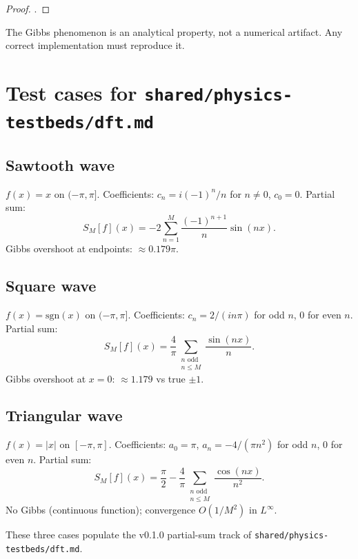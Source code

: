 \documentclass[11pt,a4paper]{article}
\theoremstyle{definition}
\theoremstyle{plain}
\begin{document}
\begin{proof}
\cite[§3.5]{Folland1992}.
\end{proof}

The Gibbs phenomenon is an analytical property, not a numerical artifact.
Any correct implementation must reproduce it.

\section{Test cases for \texttt{shared/physics-testbeds/dft.md}}

\subsection{Sawtooth wave}

$f(x) = x$ on $(-\pi, \pi]$. Coefficients: $c_n = i(-1)^n/n$ for $n \neq 0$,
$c_0 = 0$. Partial sum:
\[
S_M[f](x) = -2 \sum_{n=1}^{M} \frac{(-1)^{n+1}}{n} \sin(nx).
\]
Gibbs overshoot at endpoints: $\approx 0.179\pi$.

\subsection{Square wave}

$f(x) = \mathrm{sgn}(x)$ on $(-\pi, \pi]$. Coefficients: $c_n = 2/(i n \pi)$
for odd $n$, $0$ for even $n$. Partial sum:
\[
S_M[f](x) = \frac{4}{\pi} \sum_{\substack{n \text{ odd}\\ n \leq M}} \frac{\sin(nx)}{n}.
\]
Gibbs overshoot at $x = 0$: $\approx 1.179$ vs true $\pm 1$.

\subsection{Triangular wave}

$f(x) = |x|$ on $[-\pi, \pi]$. Coefficients: $a_0 = \pi$,
$a_n = -4/(\pi n^2)$ for odd $n$, $0$ for even $n$. Partial sum:
\[
S_M[f](x) = \frac{\pi}{2} - \frac{4}{\pi} \sum_{\substack{n \text{ odd}\\ n \leq M}} \frac{\cos(nx)}{n^2}.
\]
No Gibbs (continuous function); convergence $O(1/M^2)$ in $L^\infty$.

These three cases populate the v0.1.0 partial-sum track of
\texttt{shared/physics-testbeds/dft.md}.

\printbibliography
\end{document}
